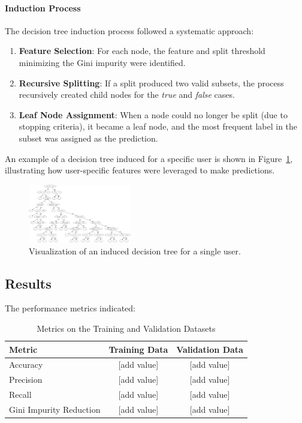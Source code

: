 \documentclass[a3paper,12pt]{article}
\begin{document}
\paragraph{Induction Process}
The decision tree induction process followed a systematic approach:
\begin{enumerate}
    \item \textbf{Feature Selection}:
    For each node, the feature and split threshold minimizing the Gini impurity were identified.

    \item \textbf{Recursive Splitting}:
    If a split produced two valid subsets, the process recursively created child nodes for the \textit{true} and \textit{false} cases.

    \item \textbf{Leaf Node Assignment}:
    When a node could no longer be split (due to stopping criteria), it became a leaf node, and the most frequent label in the subset was assigned as the prediction.
\end{enumerate}

An example of a decision tree induced for a specific user is shown in Figure~\ref{fig:decision_tree}, illustrating how user-specific features were leveraged to make predictions.

\begin{figure}[h!]
    \centering
    \includegraphics[width=0.4\textwidth]{tree}
    \caption{Visualization of an induced decision tree for a single user.}
    \label{fig:decision_tree}
\end{figure}

\subsection{Results}
The performance metrics indicated:

\begin{table}[h]
    \centering
    \begin{tabular}{|l|c|c|}
        \hline
        \textbf{Metric} & \textbf{Training Data} & \textbf{Validation Data} \\ \hline
        Accuracy        & [add value]         & [add value]           \\ \hline
        Precision       & [add value]         & [add value]           \\ \hline
        Recall          & [add value]         & [add value]           \\ \hline
        Gini Impurity Reduction & [add value]   & [add value]           \\ \hline
    \end{tabular}
    \caption{Metrics on the Training and Validation Datasets}
    \label{tab:performance_metrics}
\end{table}
\end{document}
